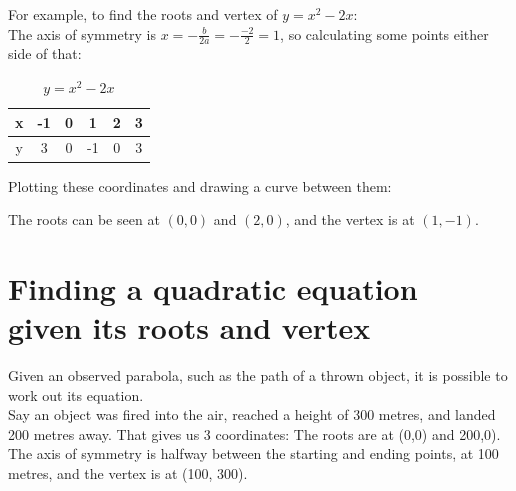 \documentclass[12pt]{article}
\begin{document}
For example, to find the roots and vertex of $y=x^2-2x$:\\

The axis of symmetry is $x=-\frac{b}{2a}=-\frac{-2}{2}=1$, so calculating some points either side of that:
\begin{table}[h]
    \centering
    \begin{tabular}{c|c|c|c|c|c}
         x & -1 & 0 &  1 & 2 & 3 \\\hline
         y &  3 & 0 & -1 & 0 & 3 
    \end{tabular}
    \caption*{$y=x^2-2x$}
\end{table}

Plotting these coordinates and drawing a curve between them:

\begin{center}
\end{center}

The roots can be seen at $(0,0)$ and $(2,0)$, and the vertex is at $(1,-1)$.

\section*{Finding a quadratic equation\\given its roots and vertex}

Given an observed parabola, such as the path of a thrown object, it is possible to work out its equation.\\

Say an object was fired into the air, reached a height of 300 metres, and landed 200 metres away. That gives us 3 coordinates: The roots are at (0,0) and 200,0). The axis of symmetry is halfway between the starting and ending points, at 100 metres, and the vertex is at (100, 300).\\
\end{document}
